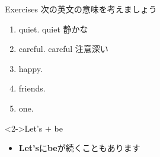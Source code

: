 \documentclass[aspectratio=169,xcolor={dvipsnames,table}]{beamer}
\begin{document}
\begin{frame}[plain]{Exercises}
次の英文の意味を考えましょう

 \begin{enumerate}
  \item {}  quiet.%
\hfill{\scriptsize quiet  静かな}
  \item {}  careful.%
\hfill{\scriptsize careful  注意深い}
  \item {}  happy.
  \item {}  friends.
  \item {}  one.
 \end{enumerate}

\vfill

\begin{block}<2->{Let's $+$ be}
\begin{itemize}[square]\small
 \item \textbf{Let's}に\textbf{be}が続くこともあります
\end{itemize}
\end{block}
\hfill{\scriptsize {}}

\end{frame}
\end{document}
